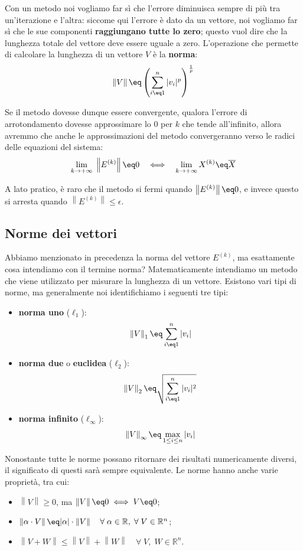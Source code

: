 Con un metodo noi vogliamo far sì che l'errore diminuisca sempre di più tra un'iterazione e l'altra: siccome qui l'errore è dato da un vettore, noi vogliamo far sì che le sue componenti \textbf{raggiungano tutte lo zero}; questo vuol dire che la lunghezza totale del vettore deve essere uguale a zero. L'operazione che permette di calcolare la lunghezza di un vettore $V$ è la \textbf{norma}:
\[ \left\| V \right\| \eq \left( \sum_{i \eq 1}^n |v_i|^p \right)^{\frac{1}{p}} \]

Se il metodo dovesse dunque essere convergente, qualora l'errore di arrotondamento dovesse approssimare lo 0 per $k$ che tende all'infinito, allora avremmo che anche le approssimazioni del metodo convergeranno verso le radici delle equazioni del sistema:
\[ \lim_{k \to +\infty} \; \left\| E^{(k)} \right\| \eq 0 \quad \Longleftrightarrow \quad \lim_{k \to +\infty} X^{(k)} \eq \overline{X} \]

A lato pratico, è raro che il metodo si fermi quando $\left\| E^{(k)} \right\| \eq 0$, e invece questo si arresta quando $\left\| E^{(k)} \right\| \leq \epsilon$.

\subsection{Norme dei vettori}

Abbiamo menzionato in precedenza la norma del vettore $E^{(k)}$, ma esattamente cosa intendiamo con il termine norma? Matematicamente intendiamo un metodo che viene utilizzato per misurare la lunghezza di un vettore. Esistono vari tipi di norme, ma generalmente noi identifichiamo i seguenti tre tipi:
\begin{itemize}
    \item \textbf{norma uno} ($\ell_1$):
    \[ \left\| V \right\|_1 \eq \sum_{i \eq 1}^n |v_i| \]

    \item \textbf{norma due} o \textbf{euclidea} ($\ell_2$):
    \[ \left\| V \right\|_2 \eq \sqrt{\sum_{i \eq 1}^n |v_i|^2} \]

    \item \textbf{norma infinito} ($\ell_\infty$):
    \[ \left\| V \right\|_\infty \eq \max_{1 \leq i \leq n} |v_i| \]
\end{itemize}

Nonostante tutte le norme possano ritornare dei risultati numericamente diversi, il significato di questi sarà sempre equivalente. Le norme hanno anche varie proprietà, tra cui:
\begin{itemize}
    \item $\left\| V \right\| \geq 0$, ma $\left\| V \right\| \eq 0 \; \Longleftrightarrow \; V \eq 0$;
    \item $\left\| \alpha \cdot V \right\| \eq |\alpha| \cdot \left\| V \right\| \quad \forall \; \alpha \in \mathbb{R}, \; \forall \; V \in \mathbb{R}^n$;
    \item $\left\| V + W \right\| \leq \left\| V \right\| + \left\| W \right\| \quad \forall \; V, \; W \in \mathbb{R}^n$.
\end{itemize}